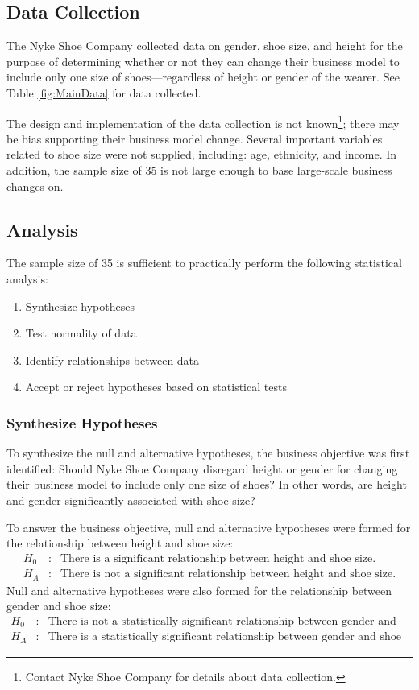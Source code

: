 
\subsection{Data Collection}
The Nyke Shoe Company collected data on gender, shoe size, and height for the purpose of determining whether or not they can change their business model to include only one size of shoes—regardless of height or gender of the wearer. See Table \ref{fig:MainData} for data collected.

The design and implementation of the data collection is not known\footnote{Contact Nyke Shoe Company for details about data collection.}; there may be bias supporting their business model change. Several important variables related to shoe size were not supplied, including: age, ethnicity, and income. In addition, the sample size of 35 is not large enough to base large-scale business changes on.

\subsection{Analysis}
The sample size of 35 is sufficient to practically perform the following statistical analysis:
\begin{enumerate}
    \item Synthesize hypotheses
    \item Test normality of data
    \item Identify relationships between data
    \item Accept or reject hypotheses based on statistical tests
\end{enumerate}
\par

\subsubsection{Synthesize Hypotheses}
To synthesize the null and alternative hypotheses, the business objective was first identified: Should Nyke Shoe Company disregard height or gender for changing their business model to include only one size of shoes? In other words, are height and gender significantly associated with shoe size?

To answer the business objective, null and alternative hypotheses were formed for the relationship between height and shoe size:
\begin{align*}
H_0 &:& \text{There is a significant relationship between height and shoe size.}\\
H_A &:& \text{There is not a significant relationship between height and shoe size.}
\end{align*}
Null and alternative hypotheses were also formed for the relationship between gender and shoe size:
\begin{align*}
H_0&:&\text{There is not a statistically significant relationship between gender and shoe size.} \\
H_A&:&\text{There is a statistically significant relationship between gender and shoe size.}
\end{align*}

